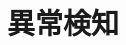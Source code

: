 \documentclass[../main]{subfiles}
\begin{document}
\section{異常検知}
\label{sec:pmethod_anomaly_detection}
\end{document}
